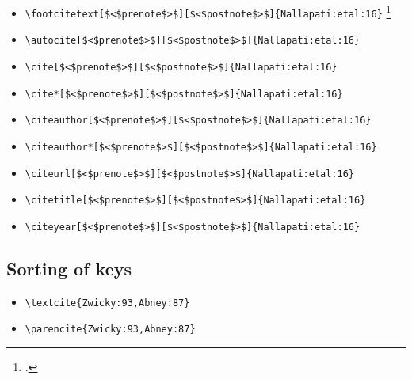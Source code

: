 \begin{itemize}
\item \verb=\footcitetext[$<$prenote$>$][$<$postnote$>$]{Nallapati:etal:16}= \newline \footcitetext[$<$prenote$>$][$<$postnote$>$]{Nallapati:etal:16}
\item \verb=\autocite[$<$prenote$>$][$<$postnote$>$]{Nallapati:etal:16}= \newline  \autocite[$<$prenote$>$][$<$postnote$>$]{Nallapati:etal:16}
\item \verb=\cite[$<$prenote$>$][$<$postnote$>$]{Nallapati:etal:16}= \newline  \cite[$<$prenote$>$][$<$postnote$>$]{Nallapati:etal:16}
\item \verb=\cite*[$<$prenote$>$][$<$postnote$>$]{Nallapati:etal:16}= \newline  \cite*[$<$prenote$>$][$<$postnote$>$]{Nallapati:etal:16}
\item \verb=\citeauthor[$<$prenote$>$][$<$postnote$>$]{Nallapati:etal:16}= \newline \citeauthor[$<$prenote$>$][$<$postnote$>$]{Nallapati:etal:16}
\item \verb=\citeauthor*[$<$prenote$>$][$<$postnote$>$]{Nallapati:etal:16}= \newline \citeauthor*[$<$prenote$>$][$<$postnote$>$]{Nallapati:etal:16}
\item \verb=\citeurl[$<$prenote$>$][$<$postnote$>$]{Nallapati:etal:16}= \newline {}
\item \verb=\citetitle[$<$prenote$>$][$<$postnote$>$]{Nallapati:etal:16}= \newline {}
\item \verb=\citeyear[$<$prenote$>$][$<$postnote$>$]{Nallapati:etal:16}= \newline \citeyear[$<$prenote$>$][$<$postnote$>$]{Nallapati:etal:16}
\end{itemize} 

\subsection{Sorting of keys}

\begin{itemize}
\item \verb=\textcite{Zwicky:93,Abney:87}= \newline \textcite{Zwicky:93,Abney:87}
\item \verb=\parencite{Zwicky:93,Abney:87}= \newline \parencite{Zwicky:93,Abney:87}
\end{itemize}

